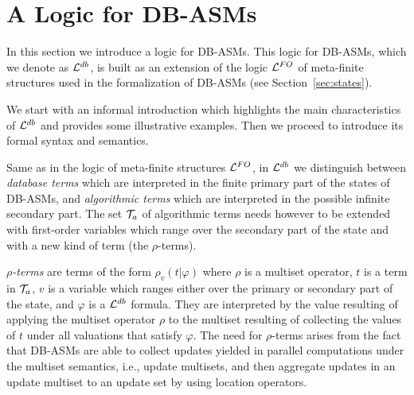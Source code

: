 \documentclass[preprint,11pt]{elsarticle}
\theoremstyle{definition}
\theoremstyle{remark}
\begin{document}
\section{A Logic for DB-ASMs}\label{sec:dtc}

In this section we introduce a logic for DB-ASMs. This logic for DB-ASMs, which we denote as ${\cal L}^{db}$, is built as an extension of the logic ${\cal L}^{FO}$ of meta-finite structures used in the formalization of DB-ASMs (see Section~\ref{sec:states}). 

We start with an informal introduction which highlights the main characteristics of ${\cal L}^{db}$ and provides some illustrative examples. Then we proceed to introduce its formal syntax and semantics. 

Same as in the logic of meta-finite structures ${\cal L}^{FO}$, in ${\cal L}^{db}$ we distinguish between \emph{database terms} which are interpreted in the finite primary part of the states of DB-ASMs, and \emph{algorithmic terms} which are interpreted in the possible infinite secondary part. The set ${\cal T}_{a}$ of algorithmic terms needs however to be extended with first-order variables which range over the secondary part of the state and with a new kind of term (the $\rho$-terms). 

\emph{$\rho$-terms} are terms of the form $\rho_{v}(t|\varphi)$ where $\rho$ is a multiset operator, $t$ is a term in ${\cal T}_a$, $v$ is a variable which ranges either over the primary or secondary part of the state, and $\varphi$ is a ${\cal L}^{db}$ formula.  They are interpreted by the value resulting of applying the multiset operator $\rho$ to the multiset resulting of collecting the values of $t$ under all valuations that satisfy $\varphi$. The need for $\rho$-terms arises from the fact that DB-ASMs are able to collect updates yielded in parallel computations under the multiset semantics, i.e., update multisets, and then aggregate updates in an update multiset to an update set by using location operators.  
\end{document}
